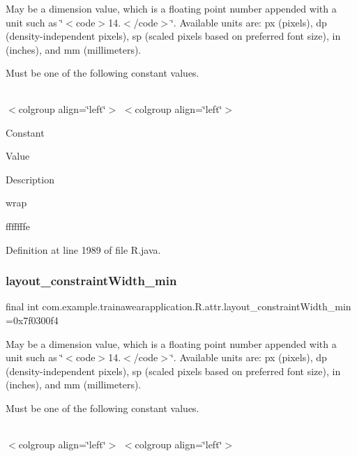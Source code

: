 May be a dimension value, which is a floating point number appended with a unit such as \char`\"{}$<$code$>$14.\+5sp$<$/code$>$\char`\"{}. Available units are\+: px (pixels), dp (density-\/independent pixels), sp (scaled pixels based on preferred font size), in (inches), and mm (millimeters). 

Must be one of the following constant values.

\tabulinesep=1mm
\begin{longtabu}spread 0pt [c]{*{0}{|X[-1]}|}
\hline
\end{longtabu}
$<$colgroup align=\char`\"{}left\char`\"{}$>$ $<$colgroup align=\char`\"{}left\char`\"{}$>$ 

Constant

Value

Description 

wrap

fffffffe

Definition at line 1989 of file R.\+java.

\mbox{\label{classcom_1_1example_1_1trainawearapplication_1_1_r_1_1attr_a8f6b8b1dfa9da5b3b785aca470ae8cdb}} 
\subsubsection{\texorpdfstring{layout\_constraintWidth\_min}{layout\_constraintWidth\_min}}
{\footnotesize\ttfamily final int com.\+example.\+trainawearapplication.\+R.\+attr.\+layout\+\_\+constraint\+Width\+\_\+min =0x7f0300f4\hspace{0.3cm}{\ttfamily [static]}}

May be a dimension value, which is a floating point number appended with a unit such as \char`\"{}$<$code$>$14.\+5sp$<$/code$>$\char`\"{}. Available units are\+: px (pixels), dp (density-\/independent pixels), sp (scaled pixels based on preferred font size), in (inches), and mm (millimeters). 

Must be one of the following constant values.

\tabulinesep=1mm
\begin{longtabu}spread 0pt [c]{*{0}{|X[-1]}|}
\hline
\end{longtabu}
$<$colgroup align=\char`\"{}left\char`\"{}$>$ $<$colgroup align=\char`\"{}left\char`\"{}$>$ 

